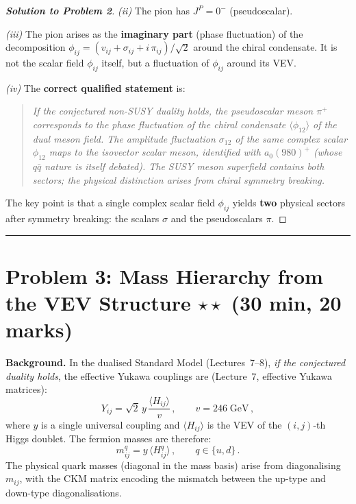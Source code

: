 \documentclass[11pt,a4paper]{article}
\begin{document}
\begin{proof}[\textbf{Solution to Problem 2}]
\textit{(ii)} The pion has $J^P = 0^-$ (pseudoscalar).

\textit{(iii)} The pion arises as the \textbf{imaginary part}
(phase fluctuation) of the decomposition $\phi_{ij} = (v_{ij} +
\sigma_{ij} + i\,\pi_{ij})/\sqrt{2}$ around the chiral condensate.
It is not the scalar field $\phi_{ij}$ itself, but a fluctuation of
$\phi_{ij}$ around its VEV.

\textit{(iv)} The \textbf{correct qualified statement} is:

\begin{quote}
\emph{If the conjectured non-SUSY duality holds, the pseudoscalar
meson $\pi^+$ corresponds to the phase fluctuation of the chiral
condensate $\langle \phi_{12} \rangle$ of the dual meson field.  The
amplitude fluctuation $\sigma_{12}$ of the same complex scalar
$\phi_{12}$ maps to the isovector scalar meson, identified with
$a_0(980)^+$ (whose $q\bar{q}$ nature is itself debated).  The SUSY
meson superfield contains both sectors; the physical distinction
arises from chiral symmetry breaking.}
\end{quote}

The key point is that a single complex scalar field $\phi_{ij}$
yields \textbf{two} physical sectors after symmetry breaking: the
scalars $\sigma$ and the pseudoscalars $\pi$.

\end{proof}


\bigskip
\hrule
\bigskip


\section*{Problem 3: Mass Hierarchy from the VEV Structure
  \hfill $\star\star$ \normalsize(30 min, 20 marks)}
\label{prob:mass-hierarchy}

\noindent\textbf{Background.}
In the dualised Standard Model (Lectures~7--8), \emph{if the
conjectured duality holds}, the effective Yukawa couplings are
(Lecture~7, effective Yukawa matrices):
\begin{equation}\label{eq:eff-yukawa}
  Y_{ij} = \sqrt{2}\,y\,\frac{\langle H_{ij} \rangle}{v}\,,
  \qquad v = 246\;\text{GeV}\,,
\end{equation}
where $y$ is a single universal coupling and $\langle H_{ij} \rangle$
is the VEV of the $(i,j)$-th Higgs doublet.  The fermion masses are
therefore:
\begin{equation}\label{eq:fermion-mass}
  m_{ij}^{q} = y\,\langle H_{ij}^{q} \rangle\,,
  \qquad q \in \{u, d\}\,.
\end{equation}
The physical quark masses (diagonal in the mass basis) arise from
diagonalising $m_{ij}$, with the CKM matrix encoding the mismatch
between the up-type and down-type diagonalisations.
\end{document}
